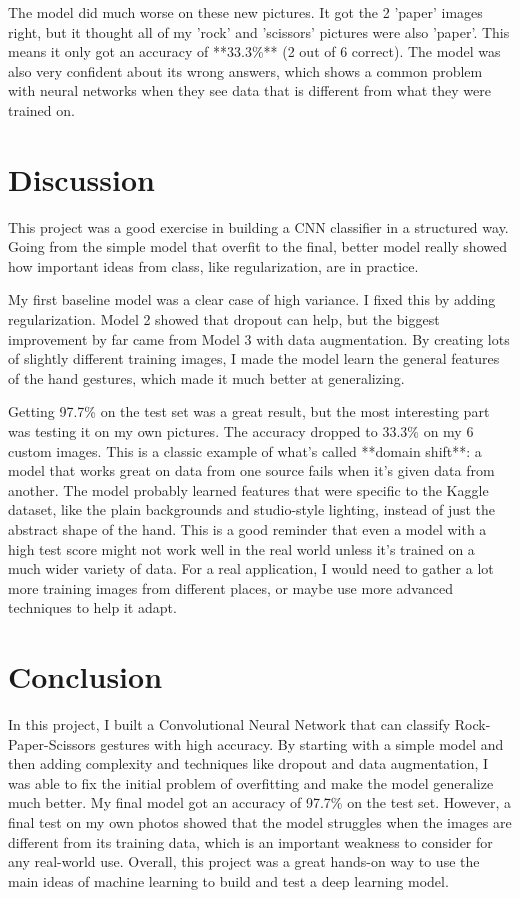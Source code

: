\documentclass[pdflatex,sn-mathphys-num]{sn-jnl}%
\theoremstyle{thmstyleone}%
\theoremstyle{thmstyletwo}%
\theoremstyle{thmstylethree}%
\begin{document}
The model did much worse on these new pictures. It got the 2 'paper' images right, but it thought all of my 'rock' and 'scissors' pictures were also 'paper'. This means it only got an accuracy of **33.3\%** (2 out of 6 correct). The model was also very confident about its wrong answers, which shows a common problem with neural networks when they see data that is different from what they were trained on.

\section{Discussion}\label{sec12}

This project was a good exercise in building a CNN classifier in a structured way. Going from the simple model that overfit to the final, better model really showed how important ideas from class, like regularization, are in practice.

My first baseline model was a clear case of high variance. I fixed this by adding regularization. Model 2 showed that dropout can help, but the biggest improvement by far came from Model 3 with data augmentation. By creating lots of slightly different training images, I made the model learn the general features of the hand gestures, which made it much better at generalizing.

Getting 97.7\% on the test set was a great result, but the most interesting part was testing it on my own pictures. The accuracy dropped to 33.3\% on my 6 custom images. This is a classic example of what's called **domain shift**: a model that works great on data from one source fails when it's given data from another. The model probably learned features that were specific to the Kaggle dataset, like the plain backgrounds and studio-style lighting, instead of just the abstract shape of the hand. This is a good reminder that even a model with a high test score might not work well in the real world unless it's trained on a much wider variety of data. For a real application, I would need to gather a lot more training images from different places, or maybe use more advanced techniques to help it adapt.

\section{Conclusion}\label{sec13}

In this project, I built a Convolutional Neural Network that can classify Rock-Paper-Scissors gestures with high accuracy. By starting with a simple model and then adding complexity and techniques like dropout and data augmentation, I was able to fix the initial problem of overfitting and make the model generalize much better. My final model got an accuracy of 97.7\% on the test set. However, a final test on my own photos showed that the model struggles when the images are different from its training data, which is an important weakness to consider for any real-world use. Overall, this project was a great hands-on way to use the main ideas of machine learning to build and test a deep learning model.
\end{document}
